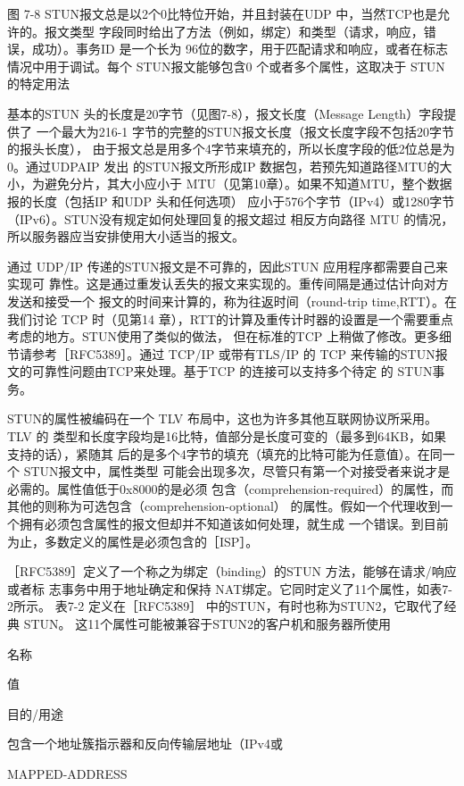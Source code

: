 图 7-8
STUN报文总是以2个0比特位开始，并且封装在UDP 中，当然TCP也是允许的。报文类型
字段同时给出了方法（例如，绑定）和类型（请求，响应，错误，成功）。事务ID 是一个长为
96位的数字，用于匹配请求和响应，或者在标志情况中用于调试。每个 STUN报文能够包含0
个或者多个属性，这取决于 STUN 的特定用法

基本的STUN 头的长度是20字节（见图7-8），报文长度（Message Length）字段提供了
一个最大为216-1 字节的完整的STUN报文长度（报文长度字段不包括20字节的报头长度），
由于报文总是用多个4字节来填充的，所以长度字段的低2位总是为0。通过UDPAIP 发出
的STUN报文所形成IP 数据包，若预先知道路径MTU的大小，为避免分片，其大小应小于
MTU（见第10章）。如果不知道MTU，整个数据报的长度（包括IP 和UDP 头和任何选项）
应小于576个字节（IPv4）或1280字节（IPv6）。STUN没有规定如何处理回复的报文超过
相反方向路径 MTU 的情况，所以服务器应当安排使用大小适当的报文。

通过 UDP/IP 传递的STUN报文是不可靠的，因此STUN 应用程序都需要自己来实现可
靠性。这是通过重发认丢失的报文来实现的。重传间隔是通过估计向对方发送和接受一个
报文的时间来计算的，称为往返时间（round-trip time,RTT）。在我们讨论 TCP 时（见第14
章），RTT的计算及重传计时器的设置是一个需要重点考虑的地方。STUN使用了类似的做法，
但在标准的TCP 上稍做了修改。更多细节请参考［RFC5389］。通过 TCP/IP 或带有TLS/IP 的
TCP 来传输的STUN报文的可靠性问题由TCP来处理。基于TCP 的连接可以支持多个待定
的 STUN事务。

STUN的属性被编码在一个 TLV 布局中，这也为许多其他互联网协议所采用。TLV 的
类型和长度字段均是16比特，值部分是长度可变的（最多到64KB，如果支持的话），紧随其
后的是多个4字节的填充（填充的比特可能为任意值）。在同一个 STUN报文中，属性类型
可能会出现多次，尽管只有第一个对接受者来说才是必需的。属性值低于0x8000的是必须
包含（comprehension-required）的属性，而其他的则称为可选包含（comprehension-optional）
的属性。假如一个代理收到一个拥有必须包含属性的报文但却并不知道该如何处理，就生成
一个错误。到目前为止，多数定义的属性是必须包含的［ISP］。

［RFC5389］定义了一个称之为绑定（binding）的STUN 方法，能够在请求/响应或者标
志事务中用于地址确定和保持 NAT绑定。它同时定义了11个属性，如表7-2所示。
表7-2 定义在［RFC5389］ 中的STUN，有时也称为STUN2，它取代了经典 STUN。
这11个属性可能被兼容于STUN2的客户机和服务器所使用

名称

值

目的/用途

包含一个地址簇指示器和反向传输层地址（IPv4或

MAPPED-ADDRESS

